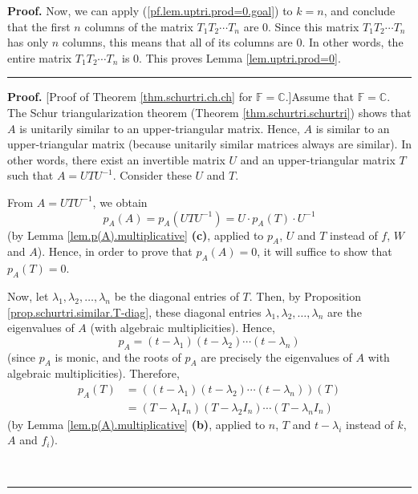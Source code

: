 \documentclass[numbers=enddot,12pt,final,onecolumn,notitlepage]{scrartcl}%
\numberwithin{exer}{subsection}
\theoremstyle{definition}
\newenvironment{proof}[1][Proof]{\noindent\textbf{#1.} }{\ \rule{0.5em}{0.5em}}
\begin{document}
\begin{proof}
Now, we can apply (\ref{pf.lem.uptri.prod=0.goal}) to $k=n$, and conclude that
the first $n$ columns of the matrix $T_{1}T_{2}\cdots T_{n}$ are $0$. Since
this matrix $T_{1}T_{2}\cdots T_{n}$ has only $n$ columns, this means that all
of its columns are $0$. In other words, the entire matrix $T_{1}T_{2}\cdots
T_{n}$ is $0$. This proves Lemma \ref{lem.uptri.prod=0}.
\end{proof}

\begin{proof}
[Proof of Theorem \ref{thm.schurtri.ch.ch} for $\mathbb{F}=\mathbb{C}$.]Assume
that $\mathbb{F}=\mathbb{C}$. The Schur triangularization theorem (Theorem
\ref{thm.schurtri.schurtri}) shows that $A$ is unitarily similar to an
upper-triangular matrix. Hence, $A$ is similar to an upper-triangular matrix
(because unitarily similar matrices always are similar). In other words, there
exist an invertible matrix $U$ and an upper-triangular matrix $T$ such that
$A=UTU^{-1}$. Consider these $U$ and $T$.

From $A=UTU^{-1}$, we obtain
\[
p_{A}\left(  A\right)  =p_{A}\left(  UTU^{-1}\right)  =U\cdot p_{A}\left(
T\right)  \cdot U^{-1}%
\]
(by Lemma \ref{lem.p(A).multiplicative} \textbf{(c)}, applied to $p_{A}$, $U$
and $T$ instead of $f$, $W$ and $A$). Hence, in order to prove that
$p_{A}\left(  A\right)  =0$, it will suffice to show that $p_{A}\left(
T\right)  =0$.

Now, let $\lambda_{1},\lambda_{2},\ldots,\lambda_{n}$ be the diagonal entries
of $T$. Then, by Proposition \ref{prop.schurtri.similar.T-diag}, these
diagonal entries $\lambda_{1},\lambda_{2},\ldots,\lambda_{n}$ are the
eigenvalues of $A$ (with algebraic multiplicities). Hence,%
\[
p_{A}=\left(  t-\lambda_{1}\right)  \left(  t-\lambda_{2}\right)
\cdots\left(  t-\lambda_{n}\right)
\]
(since $p_{A}$ is monic, and the roots of $p_{A}$ are precisely the
eigenvalues of $A$ with algebraic multiplicities). Therefore,%
\begin{align}
p_{A}\left(  T\right)   &  =\left(  \left(  t-\lambda_{1}\right)  \left(
t-\lambda_{2}\right)  \cdots\left(  t-\lambda_{n}\right)  \right)  \left(
T\right) \nonumber\\
&  =\left(  T-\lambda_{1}I_{n}\right)  \left(  T-\lambda_{2}I_{n}\right)
\cdots\left(  T-\lambda_{n}I_{n}\right)
\label{pf.thm.schurtri.ch.ch.F=C.pA(T)=}%
\end{align}
(by Lemma \ref{lem.p(A).multiplicative} \textbf{(b)}, applied to $n$, $T$ and
$t-\lambda_{i}$ instead of $k$, $A$ and $f_{i}$).


\end{proof}
\end{document}
